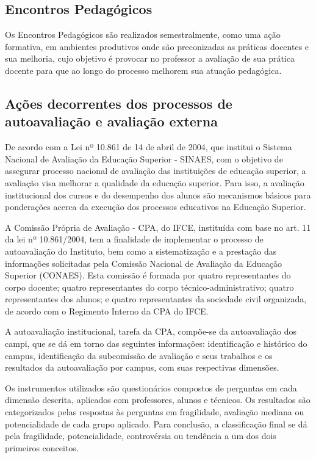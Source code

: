\subsection{Encontros Pedagógicos}

Os Encontros Pedagógicos são realizados semestralmente, como uma ação formativa, em ambientes produtivos onde são preconizadas as práticas docentes e sua melhoria, cujo objetivo é provocar no professor a avaliação de sua prática docente para que ao longo do processo melhorem sua atuação pedagógica.

\subsection{Ações decorrentes dos processos de autoavaliação e avaliação externa}

De acordo com a Lei nº 10.861 de 14 de abril de 2004, que institui o Sistema Nacional de Avaliação da Educação Superior - SINAES, com o objetivo de assegurar processo nacional de avaliação das instituições de educação superior, a avaliação visa melhorar a qualidade da educação superior. Para isso, a avaliação institucional dos cursos e do desempenho dos alunos são mecanismos básicos para ponderações acerca da execução dos processos educativos na Educação Superior.

A Comissão Própria de Avaliação - CPA, do IFCE, instituída com base no art. 11 da lei nº 10.861/2004, tem a finalidade de implementar o processo de autoavaliação do Instituto, bem como a sistematização e a prestação das informações solicitadas pela Comissão Nacional de Avaliação da Educação Superior (CONAES). Esta comissão é formada por quatro representantes do corpo docente; quatro representantes do corpo técnico-administrativo; quatro representantes dos alunos; e quatro representantes da sociedade civil organizada, de acordo com o Regimento Interno da CPA do IFCE.

A autoavaliação institucional, tarefa da CPA, compõe-se da autoavaliação dos campi, que se dá em torno das seguintes informações: identificação e histórico do campus, identificação da subcomissão de avaliação e seus trabalhos e os resultados da autoavaliação por campus, com suas respectivas dimensões. 

Os instrumentos utilizados são questionários compostos de perguntas em cada dimensão descrita, aplicados com professores, alunos e técnicos. Os resultados são categorizados pelas respostas às perguntas em fragilidade, avaliação mediana ou potencialidade de cada grupo aplicado. Para conclusão, a classificação final se dá pela fragilidade, potencialidade, controvérsia ou tendência a um dos dois primeiros conceitos. 

